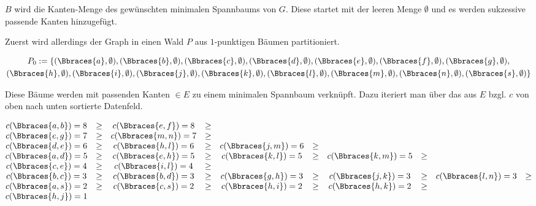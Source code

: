 \begin{solution}
\begin{enumerate}[label = \arabic*.]
    $B$ wird die Kanten-Menge des gewünschten minimalen Spannbaums von $G$.
    Diese startet mit der leeren Menge $\emptyset$ und es werden sukzessive passende Kanten hinzugefügt.

    Zuerst wird allerdings der Graph in einen Wald $P$ aus $1$-punktigen Bäumen partitioniert.
    
    \begin{multline*}
        P_0
        :=
        \{
            (\Bbraces{a}, \emptyset),
            (\Bbraces{b}, \emptyset),
            (\Bbraces{c}, \emptyset),
            (\Bbraces{d}, \emptyset),
            (\Bbraces{e}, \emptyset),
            (\Bbraces{f}, \emptyset),
            (\Bbraces{g}, \emptyset), \\
            (\Bbraces{h}, \emptyset),
            (\Bbraces{i}, \emptyset),
            (\Bbraces{j}, \emptyset),
            (\Bbraces{k}, \emptyset),
            (\Bbraces{l}, \emptyset),
            (\Bbraces{m}, \emptyset),
            (\Bbraces{n}, \emptyset),
            (\Bbraces{s}, \emptyset)
        \}
    \end{multline*}
    
    Diese Bäume werden mit passenden Kanten $\in E$ zu einem minimalen Spannbaum verknüpft.
    Dazu iteriert man über das aus $E$ bzgl. $c$ von oben nach unten sortierte Datenfeld.

    \begin{align*}
        \begin{matrix}
            c(\Bbraces{a, b}) = 8 & \geq & c(\Bbraces{e, f}) = 8 & \geq &                       &      &                       &      &                       &      \\
            c(\Bbraces{e, g}) = 7 & \geq & c(\Bbraces{m, n}) = 7 & \geq &                       &      &                       &      &                       &      \\
            c(\Bbraces{d, e}) = 6 & \geq & c(\Bbraces{h, l}) = 6 & \geq & c(\Bbraces{j, m}) = 6 & \geq &                       &      &                       &      \\
            c(\Bbraces{a, d}) = 5 & \geq & c(\Bbraces{e, h}) = 5 & \geq & c(\Bbraces{k, l}) = 5 & \geq & c(\Bbraces{k, m}) = 5 & \geq &                       &      \\
            c(\Bbraces{c, e}) = 4 & \geq & c(\Bbraces{i, l}) = 4 & \geq &                       &      &                       &      &                       &      \\
            c(\Bbraces{b, c}) = 3 & \geq & c(\Bbraces{b, d}) = 3 & \geq & c(\Bbraces{g, h}) = 3 & \geq & c(\Bbraces{j, k}) = 3 & \geq & c(\Bbraces{l, n}) = 3 & \geq \\
            c(\Bbraces{a, s}) = 2 & \geq & c(\Bbraces{c, s}) = 2 & \geq & c(\Bbraces{h, i}) = 2 & \geq & c(\Bbraces{h, k}) = 2 & \geq &                       &      \\
            c(\Bbraces{h, j}) = 1 &      &                       &      &                       &      &                       &      &                       & 
        \end{matrix}
    \end{align*}


\end{enumerate}
\end{solution}
